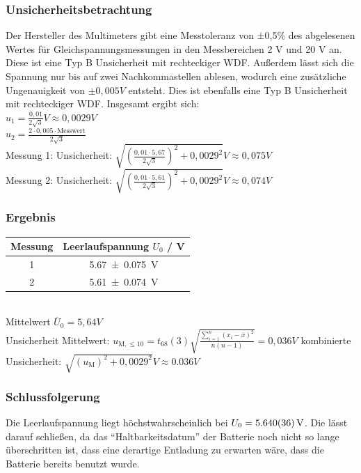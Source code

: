 \documentclass[
	a4paper,
	12pt,
	pagesize,
	ngerman
]{scrartcl}
\begin{document}
	\subsubsection{Unsicherheitsbetrachtung}
	Der Hersteller des Multimeters gibt eine Messtoleranz von ±0,5\% des abgelesenen Wertes für Gleichspannungsmessungen in den Messbereichen 2 V und 20 V an. Diese ist eine Typ B Unsicherheit mit rechteckiger WDF. Außerdem lässt sich die Spannung nur bis auf zwei Nachkommastellen ablesen, wodurch eine zusätzliche Ungenauigkeit von $\pm 0,005\si{V}$ entsteht. Dies ist ebenfalls eine Typ B Unsicherheit mit rechteckiger WDF. Insgesamt ergibt sich: \\
	$u_1= \frac{0,01}{2\sqrt{3}} \si{V} \approx 0,0029 \si{V}$ \\
	$u_2= \frac{2 \cdot 0,005 \cdot \text{Messwert}}{2 \sqrt{3}}$ \\ %
	Messung 1: Unsicherheit: $ \sqrt{(\frac{0,01 \cdot 5,67}{2 \sqrt{3}})^2 + 0,0029^2} \si{V} \approx  0,075 \si{V}$ \\
	Messung 2: Unsicherheit: $ \sqrt{(\frac{0,01 \cdot 5,61}{2 \sqrt{3}})^2 + 0,0029^2} \si{V} \approx  0,074 \si{V}$ 
	
	\subsubsection{Ergebnis}
	\begin{tabular}{| c | c |}
		\hline
	Messung & Leerlaufspannung $U_0$ / \si{V}\\ \hline
	1 & \SI{5,67 +- 0,075}{\V}\\ %
	2 & \SI{5,61 +- 0,074}{\V}\\ \hline
	\end{tabular} \\
	Mittelwert $\overline{U}_0= 5,64 \si{V}$ \\
	Unsicherheit Mittelwert: $u_{\text{M},\leq10}=t_{68}(3)\sqrt{\frac{\sum_{i=1}^{n} (x_i-\overline{x})^2}{n(n-1)}}=0,036 \si{V}$ \newline
	kombinierte Unsicherheit: $\sqrt{(u_\text{M})^2 + 0,0029^2} \si{V} \approx  0.036 \si{V}$ 
	\subsubsection{Schlussfolgerung}
	Die Leerlaufspannung liegt höchstwahrscheinlich bei $U_0=\SI{5,64 \pm 0.036}{V}$. Die lässt darauf schließen, da das \enquote{Haltbarkeitsdatum} der Batterie noch nicht so lange überschritten ist, dass eine derartige Entladung zu erwarten wäre, dass die Batterie bereits benutzt wurde. %
	
\end{document}
